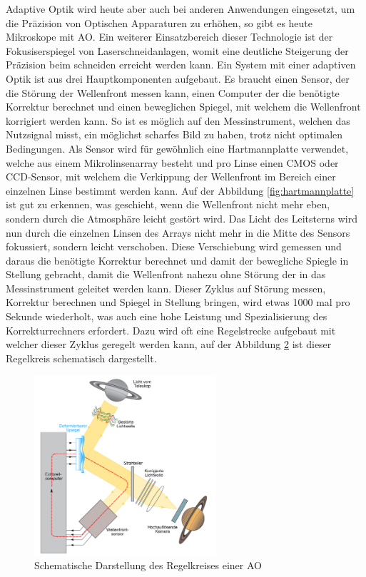 \begin{refsection}
\begin{figure}
  \label{fig:jupiter}
\end{figure}
Adaptive Optik wird heute aber auch bei anderen Anwendungen eingesetzt, um die Präzision von Optischen Apparaturen zu erhöhen, so gibt es heute Mikroskope mit AO. Ein weiterer Einsatzbereich dieser Technologie ist der Fokusiserspiegel von Laserschneidanlagen, womit eine deutliche Steigerung der Präzision beim schneiden erreicht werden kann.\newline
Ein System mit einer adaptiven Optik ist aus drei Hauptkomponenten aufgebaut. Es braucht einen Sensor, der die Störung der Wellenfront messen kann, einen Computer der die benötigte Korrektur berechnet und einen beweglichen Spiegel, mit welchem die Wellenfront korrigiert werden kann. So ist es möglich auf den Messinstrument, welchen das Nutzsignal misst, ein möglichst scharfes Bild zu haben, trotz nicht optimalen Bedingungen.\newline
Als Sensor wird für gewöhnlich eine Hartmannplatte verwendet, welche aus einem Mikrolinsenarray besteht und pro Linse einen CMOS oder CCD-Sensor, mit welchem die Verkippung der Wellenfront im Bereich einer einzelnen Linse bestimmt werden kann. Auf der Abbildung \ref{fig:hartmannplatte} ist gut zu erkennen, was geschieht, wenn die Wellenfront nicht mehr eben, sondern durch die Atmosphäre leicht gestört wird. Das Licht des Leitsterns wird nun durch die einzelnen Linsen des Arrays nicht mehr in die Mitte des Sensors fokussiert, sondern leicht verschoben. Diese Verschiebung wird gemessen und daraus die benötigte Korrektur berechnet und damit der bewegliche Spiegle in Stellung gebracht, damit die Wellenfront nahezu ohne Störung der in das Messinstrument geleitet werden kann. Dieser Zyklus auf Störung messen, Korrektur berechnen und Spiegel in Stellung bringen, wird etwas 1000 mal pro Sekunde wiederholt, was auch eine hohe Leistung und Spezialisierung des Korrekturrechners erfordert. Dazu wird oft eine Regelstrecke aufgebaut mit welcher dieser Zyklus geregelt werden kann, auf der Abbildung \ref{fig:schematischAO} ist dieser Regelkreis schematisch dargestellt.

\begin{figure}
  \centering
  \includegraphics[width=0.6\textwidth]{adaptiv/images/schematichAO}
  \caption{Schematische Darstellung des Regelkreises einer AO
    \cite{robani:schematischAO}}
  \label{fig:schematischAO}
\end{figure}


\end{refsection}
